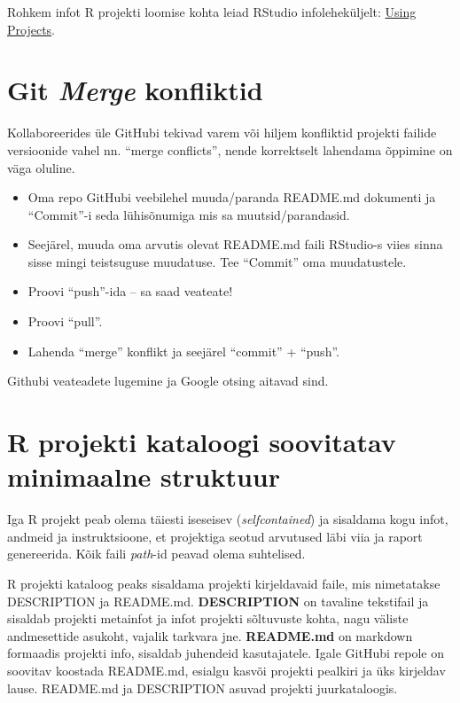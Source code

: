 \documentclass[]{book}
\providecommand{\tightlist}{%
  \setlength{\itemsep}{0pt}\setlength{\parskip}{0pt}}
\begin{document}
Rohkem infot R projekti loomise kohta leiad RStudio infoleheküljelt:
\href{https://support.rstudio.com/hc/en-us/articles/200526207-Using-Projects}{Using
Projects}.

\section{\texorpdfstring{Git \emph{Merge}
konfliktid}{Git Merge konfliktid}}\label{git-merge-konfliktid}

Kollaboreerides üle GitHubi tekivad varem või hiljem konfliktid projekti
failide versioonide vahel nn. ``merge conflicts'', nende korrektselt
lahendama õppimine on väga oluline.

\begin{itemize}
\tightlist
\item
  Oma repo GitHubi veebilehel muuda/paranda README.md dokumenti ja
  ``Commit''-i seda lühisõnumiga mis sa muutsid/parandasid.
\item
  Seejärel, muuda oma arvutis olevat README.md faili RStudio-s viies
  sinna sisse mingi teistsuguse muudatuse. Tee ``Commit'' oma
  muudatustele.
\item
  Proovi ``push''-ida -- sa saad veateate!
\item
  Proovi ``pull''.
\item
  Lahenda ``merge'' konflikt ja seejärel ``commit'' + ``push''.
\end{itemize}

Githubi veateadete lugemine ja Google otsing aitavad sind.

\section{R projekti kataloogi soovitatav minimaalne
struktuur}\label{r-projekti-kataloogi-soovitatav-minimaalne-struktuur}

Iga R projekt peab olema täiesti iseseisev (\emph{selfcontained}) ja
sisaldama kogu infot, andmeid ja instruktsioone, et projektiga seotud
arvutused läbi viia ja raport genereerida. Kõik faili \emph{path}-id
peavad olema suhtelised.

R projekti kataloog peaks sisaldama projekti kirjeldavaid faile, mis
nimetatakse DESCRIPTION ja README.md. \textbf{DESCRIPTION} on tavaline
tekstifail ja sisaldab projekti metainfot ja infot projekti sõltuvuste
kohta, nagu väliste andmesettide asukoht, vajalik tarkvara jne.
\textbf{README.md} on markdown formaadis projekti info, sisaldab
juhendeid kasutajatele. Igale GitHubi repole on soovitav koostada
README.md, esialgu kasvõi projekti pealkiri ja üks kirjeldav lause.
README.md ja DESCRIPTION asuvad projekti juurkataloogis.
\end{document}
